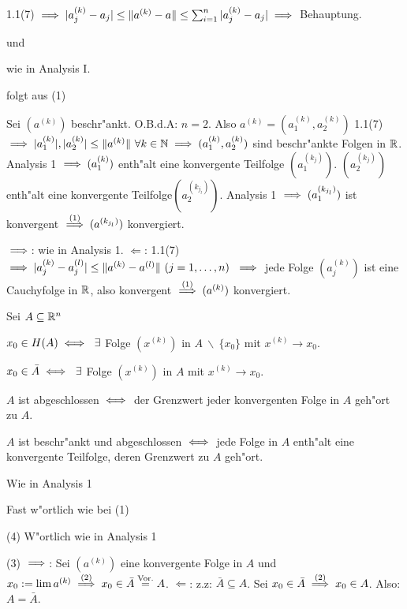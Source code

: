 \documentclass[a4paper,twoside,DIV15,BCOR12mm,chapterprefix=true,headings=twolinechapter]{scrbook}
\begin{document}
\begin{beweise}
  \item 1.1(7) $\implies |a_j^{(k)} - a_j| \le \|a^{(k)}-a\| \le \sum_{i=1}^n|a_j^{(k)} - a_j| \implies $ Behauptung.
  \item und
  \item wie in Analysis I.
  \item folgt aus (1)
  \item Sei $(a^{(k)})$ beschr"ankt. O.B.d.A: $n=2$. Also $a^{(k)}=(a_1^{(k)},a_2^{(k)})$ 1.1(7) $\implies |a_1^{(k)}|,|a_2^{(k)}|\le\|a^{(k)}\|\ \forall k\in\mathbb{N} \implies (a_1^{(k)},a_2^{(k)})$ sind beschr"ankte Folgen in $\mathbb{R}$. Analysis 1 $\implies (a_1^{(k)})$ enth"alt eine konvergente Teilfolge $(a_1^{(k_j)})$. $(a_2^{(k_j)})$ enth"alt eine konvergente Teilfolge$ (a_2^{(k_{j_l})})$. Analysis 1 $\implies (a_1^{(k_{j_l})})$ ist konvergent $\overset{(1)}{\implies} (a^{(k_{j_l})})$ konvergiert.
  \item \glqq$\implies$\grqq: wie in Analysis 1. \glqq$\Leftarrow$\grqq: 1.1(7) $\implies |a_j^{(k)}-a_j^{(l)}| \le \|a^{(k)}-a^{(l)}\|\ (j=1,\ldots,n)\ \implies$ jede Folge $(a_j^{(k)})$ ist eine Cauchyfolge in $\mathbb{R}$, also konvergent $\overset{(1)}{\implies} (a^{(k)})$ konvergiert.
\end{beweise}

\begin{satz}
Sei $A\subseteq\mathbb{R}^n$
\begin{liste}
\item $x_0 \in H(A)\iff\ \exists$ Folge $(x^{(k)})$ in $A\ \backslash\ \{x_0\}$ mit $x^{(k)}\to x_0$.
\item $x_0 \in \bar A\iff\ \exists$ Folge $(x^{(k)})$ in $A$ mit $x^{(k)}\to x_0$.
\item $A$ ist abgeschlossen $\iff$ der Grenzwert jeder konvergenten Folge in $A$ geh"ort zu $A$.
\item $A$ ist beschr"ankt und abgeschlossen $\iff$ jede Folge in $A$ enth"alt eine konvergente Teilfolge, deren Grenzwert zu $A$ geh"ort.
\end{liste}
\end{satz}

\begin{beweise}
\item Wie in Analysis 1
\item Fast w"ortlich wie bei (1)
\item[(4)] W"ortlich wie in Analysis 1
\item[(3)] \glqq$\implies$\grqq: Sei $(a^{(k)})$ eine konvergente Folge in $A$ und $x_0:=\lim a^{(k)} \overset{(2)}{\implies} x_0 \in \bar A \overset{\text{Vor.}}{=}A$. \glqq$\Leftarrow$\grqq: z.z: $\bar A \subseteq A$. Sei $x_0 \in \bar A \overset{(2)}{\implies}x_0 \in A$. Also: $A=\bar A$.
\end{beweise}
\end{document}
